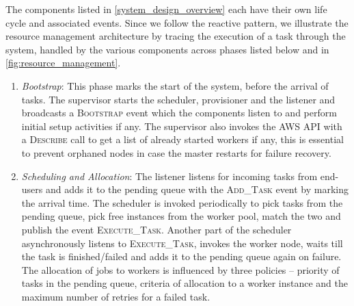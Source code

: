 \documentclass[a4paper]{IEEEtran}
\begin{document}
The components listed in \autoref{system_design_overview} each have their own life cycle and associated events.
Since we follow the reactive pattern, we illustrate the resource management architecture by tracing the execution
 of a task through the system, handled by the various components across phases listed below and in \autoref{fig:resource_management}.

\begin{enumerate}
  \item \emph{Bootstrap}: This phase marks the start of the system, before the arrival of tasks. The supervisor starts the scheduler, provisioner and the listener and 
  broadcasts a \textsc{Bootstrap} event which the components listen to and perform initial setup activities if any. The supervisor
  also invokes the AWS API with a \textsc{Describe} call to get a list of already started workers if any, this is essential to prevent
  orphaned nodes in case the master restarts for failure recovery.

  \item \emph{Scheduling and Allocation}: The listener listens for incoming tasks from end-users and adds it to the pending queue
  with the \textsc{Add\_Task} event by marking the arrival time. The scheduler is invoked periodically to pick
  tasks from the pending queue, pick free instances from the worker pool, match the two and publish the event \textsc{Execute\_Task}.
  Another part of the scheduler asynchronously listens to \textsc{Execute\_Task}, invokes the worker node, waits till 
  the task is finished/failed and adds it to the pending queue again on failure. The allocation of jobs to workers
  is influenced by three policies -- priority of tasks in the pending queue, criteria of allocation to a worker instance and
  the maximum number of retries for a failed task.


\end{enumerate}
\end{document}
